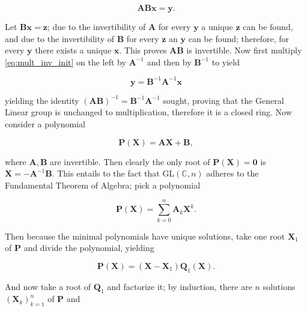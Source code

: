 \begin{equation} \mathbf{ABx} = \mathbf{y} .\label{eq:mult_inv_init}\end{equation}

	Let $\mathbf{Bx} = \mathbf{z}$; due to the invertibility of $\mathbf{A}$ for every $\mathbf{y}$ a unique $\mathbf{z}$ can be found, and due to the invertibility of $\mathbf{B}$ for every $\mathbf{z}$ an $\mathbf{y}$ can be found; therefore, for every $\mathbf{y}$ there exists a unique $\mathbf{x}$. This proves $\mathbf{AB}$ is invertible. Now first multiply \eqref{eq:mult_inv_init} on the left by $\mathbf{A}^{-1}$ and then by $\mathbf{B}^{-1}$ to yield 

\begin{equation} \mathbf{y} = \mathbf{B}^{-1}\mathbf{A}^{-1}\mathbf{x} \end{equation}

	\noindent yielding the identity $\left(\mathbf{AB}\right)^{-1} = \mathbf{B}^{-1}\mathbf{A}^{-1}$ sought, proving that the General Linear group is unchanged to multiplication, therefore it is a closed ring. Now consider a polynomial 

\begin{equation} \mathbf{P}\left(\mathbf{X}\right) = \mathbf{A}\mathbf{X} + \mathbf{B},\end{equation}

	\noindent where $\mathbf{A,B}$ are invertible. Then clearly the only root of $\mathbf{P}\left(\mathbf{X}\right) = \mathbf{0}$ is $\mathbf{X} = -\mathbf{A}^{-1}\mathbf{B}$. This entails to the fact that $\text{GL}\left(\mathbb{C},n\right)$ adheres to the Fundamental Theorem of Algebra; pick a polynomial

\begin{equation} \mathbf{P}\left(\mathbf{X}\right) = \sum_{k=0}^n \mathbf{A}_k\mathbf{X}^k .\end{equation}

	Then because the minimal polynomials have unique solutions, take one root $\mathbf{X}_1$ of $\mathbf{P}$ and divide the polynomial, yielding

\begin{equation} \mathbf{P}\left(\mathbf{X}\right) = \left(\mathbf{X} - \mathbf{X}_1\right) \mathbf{Q}_1\left(\mathbf{X}\right) .\end{equation}

	And now take a root of $\mathbf{Q}_1$ and factorize it; by induction, there are $n$ solutions $\left(\mathbf{X}_k\right)_{k=1}^n$ of $\mathbf{P}$ and

